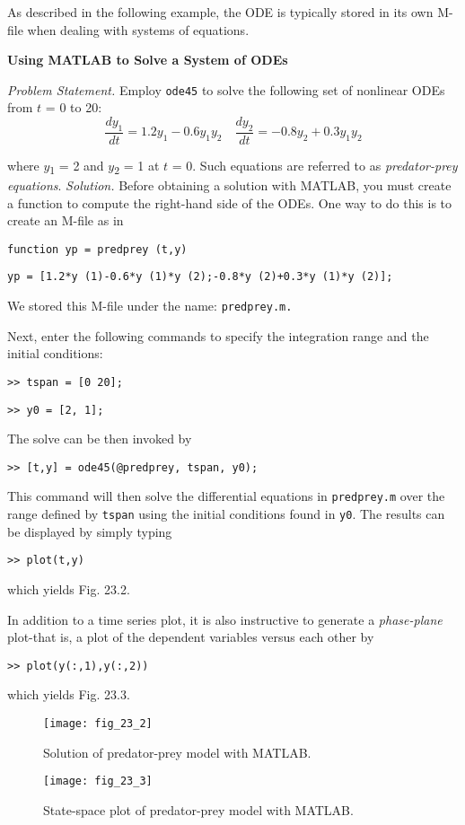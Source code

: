 \documentclass[../main.tex]{subfiles}
\begin{document}
As described in the following example, the ODE is typically stored in its own M-file when
dealing with systems of equations.

\begin{exmp} \textbf{Using MATLAB to Solve a System of ODEs}

    \noindent\textit{Problem Statement.} Employ \texttt{ode45} to solve the following set of nonlinear ODEs from $t$ = 0 to 20:
    \begin{equation}
        \frac{d y_{1}}{d t}=1.2 y_{1}-0.6 y_{1} y_{2} \quad \frac{d y_{2}}{d t}=-0.8 y_{2}+0.3 y_{1} y_{2}  \nonumber
    \end{equation}

\noindent where $y$\textsubscript{1} = 2 and $y$\textsubscript{2} = 1 at $t$ = 0. Such equations are referred to as \textit{predator-prey equations}.
\textit{Solution.} Before obtaining a solution with MATLAB, you must create a function to compute the right-hand side of the ODEs. One way to do this is to create an M-file as in

\texttt{function yp = predprey (t,y)}

\texttt{yp = [1.2*y (1)-0.6*y (1)*y (2);-0.8*y (2)+0.3*y (1)*y (2)];}

\noindent We stored this M-file under the name: \texttt{predprey.m.}

\noindent Next, enter the following commands to specify the integration range and the initial
conditions:

\texttt{>> tspan = [0 20];}

\texttt{>> y0 = [2, 1];}

\noindent The solve can be then invoked by

\texttt{>> [t,y] = ode45(@predprey, tspan, y0);}

\noindent This command will then solve the differential equations in \texttt{predprey.m} over the range
defined by \texttt{tspan} using the initial conditions found in \texttt{y0}. The results can be displayed by simply typing

\texttt{>> plot(t,y)}

\noindent which yields Fig. 23.2.

In addition to a time series plot, it is also instructive to generate a \textit{phase-plane} plot-that is, a plot of the dependent variables versus each other by

\texttt{>> plot(y(:,1),y(:,2))}

\noindent which yields Fig. 23.3.

\begin{figure}[H]
    \centering
    \texttt{[image: fig\_23\_2]}
   \caption{\textsf{Solution of predator-prey model with MATLAB.}}\label{fig:fig_23_2}
\end{figure}

\begin{figure}[H]
    \centering
    \texttt{[image: fig\_23\_3]}
   \caption{\textsf{State-space plot of predator-prey model with MATLAB.\
   }}\label{fig:fig_23_3}
\end{figure}
\end{exmp}
\end{document}
